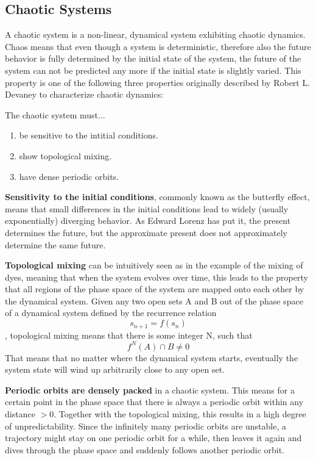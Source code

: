 \documentclass[main]{subfiles}
\begin{document}
\subsection{Chaotic Systems}
\label{subsec:chaotic-systems}

A chaotic system is a non-linear, dynamical system exhibiting chaotic dynamics. %
%
Chaos means that even though a system is deterministic, therefore also the future behavior is fully determined by the initial state of the system, the future of the system can not be predicted any more if the initial state is slightly varied. %
%
This property is one of the following three properties originally described by Robert L. Devaney \cite{bib:Devaney1989} to characterize chaotic dynamics:

The chaotic system must...
\begin{enumerate}
\item be sensitive to the intitial conditions.
\item show topological mixing.
\item have dense periodic orbits.
\end{enumerate}

\textbf{Sensitivity to the initial conditions}, commonly known as the butterfly effect, means that small differences in the initial conditions lead to widely (usually exponentially) diverging behavior. %
%
As Edward Lorenz has put it, the present determines the future, but the approximate present does not approximately determine the same future.

\textbf{Topological mixing} can be intuitively seen as in the example of the mixing of dyes, meaning that when the system evolves over time, this leads to the property that all regions of the phase space of the system are mapped onto each other by the dynamical system. %
%
Given any two open sets A and B out of the phase space of a dynamical system defined by the recurrence relation \[s_{n+1} = f(s_n)\], topological mixing means that there is some integer N, such that \[f^N(A) \cap B \neq 0\] %
%
That means that no matter where the dynamical system starts, eventually the system state will wind up arbitrarily close to any open set.

\textbf{Periodic orbits are densely packed} in a chaotic system. %
%
This means for a certain point in the phase space that there is always a periodic orbit within any distance \(> 0\). %
%
Together with the topological mixing, this results in a high degree of unpredictability. %
%
Since the infinitely many periodic orbits are unstable, a trajectory might stay on one periodic orbit for a while, then leaves it again and dives through the phase space and suddenly follows another periodic orbit.
\end{document}
